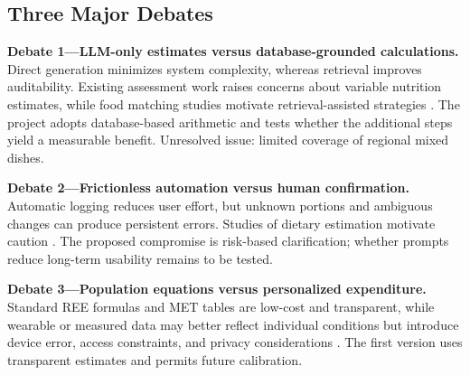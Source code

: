 \documentclass[journal,10pt]{IEEEtran}
\begin{document}
\subsection{Three Major Debates}
\textbf{Debate 1---LLM-only estimates versus database-grounded calculations.} Direct generation minimizes system complexity, whereas retrieval improves auditability. Existing assessment work raises concerns about variable nutrition estimates, while food matching studies motivate retrieval-assisted strategies \cite{nutrients,lemay}. The project adopts database-based arithmetic and tests whether the additional steps yield a measurable benefit. Unresolved issue: limited coverage of regional mixed dishes.

\textbf{Debate 2---Frictionless automation versus human confirmation.} Automatic logging reduces user effort, but unknown portions and ambiguous changes can produce persistent errors. Studies of dietary estimation motivate caution \cite{imageeval,diabot}. The proposed compromise is risk-based clarification; whether prompts reduce long-term usability remains to be tested.

\textbf{Debate 3---Population equations versus personalized expenditure.} Standard REE formulas and MET tables are low-cost and transparent, while wearable or measured data may better reflect individual conditions but introduce device error, access constraints, and privacy considerations \cite{mifflin,compendium}. The first version uses transparent estimates and permits future calibration.
\end{document}
